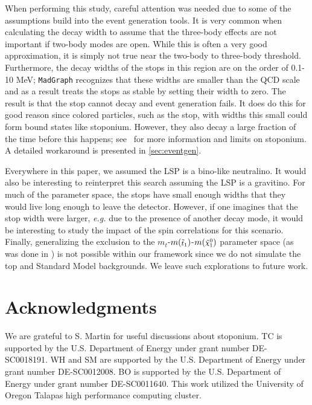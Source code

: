 \documentclass[a4paper,12pt]{article}
\def\mnino{\ensuremath{m({\footnotesize \ninoone})}}
\def\mstop{\ensuremath{m({\footnotesize \stopone})}}
\def\stopone{\ensuremath{\mathchoice%
      {\displaystyle\raise.0ex\hbox{$\displaystyle\tilde t_1$}}%
         {\textstyle\raise-.2ex\hbox{$\textstyle\tilde t_1$}}%
       {\scriptstyle\raise.0ex\hbox{$\scriptstyle\tilde t_1$}}%
 {\scriptscriptstyle\raise.0ex\hbox{$\scriptscriptstyle\tilde t_1$}}}}
\def\ninoone{\ensuremath{\mathchoice%
      {\displaystyle\raise.4ex\hbox{$\displaystyle\tilde\chi^0_1$}}%
         {\textstyle\raise.1ex\hbox{$\textstyle\tilde\chi^0_1$}}%
       {\scriptstyle\raise.3ex\hbox{$\scriptstyle\tilde\chi^0_1$}}%
 {\scriptscriptstyle\raise.3ex\hbox{$\scriptscriptstyle\tilde\chi^0_1$}}}}
\begin{document}
When performing this study, careful attention was needed due to some of the assumptions build into the event generation tools.  It is very common when calculating the decay width to assume that the three-body effects are not important if two-body modes are open.  While this is often a very good approximation, it is simply not true near the two-body to three-body threshold. Furthermore, the decay widths of the stops in this region are on the order of 0.1-10 MeV; \texttt{MadGraph} recognizes that these widths are smaller than the QCD scale and as a result treats the stops as stable by setting their width to zero.  The result is that the stop cannot decay and event generation fails.  It does do this for good reason since colored particles, such as the stop, with widths this small could form bound states like stoponium.  However, they also decay a large fraction of the time before this happens; see~\cite{Martin:2008sv,Martin:2009dj,Younkin:2009zn,Kumar:2014bca,Batell:2015zla} for more information and limits on stoponium.  A detailed workaround is presented in \cref{sec:eventgen}.

Everywhere in this paper, we assumed the LSP is a bino-like neutralino.  It would also be interesting to reinterpret this search assuming the LSP is a gravitino.  For much of the parameter space, the stops have small enough widths that they would live long enough to leave the detector.  However, if one imagines that the stop width were larger, \emph{e.g.} due to the presence of another decay mode, it would be interesting to study the impact of the spin correlations for this scenario. Finally, generalizing the exclusion to the $m_t$-$\mstop$-$\mnino$ parameter space (as was done in \cite{Czakon:2014fka}) is not possible within our framework since we do not simulate the top and Standard Model backgrounds.
We leave such explorations to future work.


\section*{Acknowledgments}

We are grateful to S. Martin for useful discussions about stoponium. 
TC is supported by the U.S. Department of Energy under grant number DE-SC0018191.  WH and SM are supported by the U.S. Department of Energy under grant number DE-SC0012008.  BO is supported by the U.S. Department of Energy under grant number DE-SC0011640.  This work utilized the University of Oregon Talapas high performance computing cluster.
\end{document}
